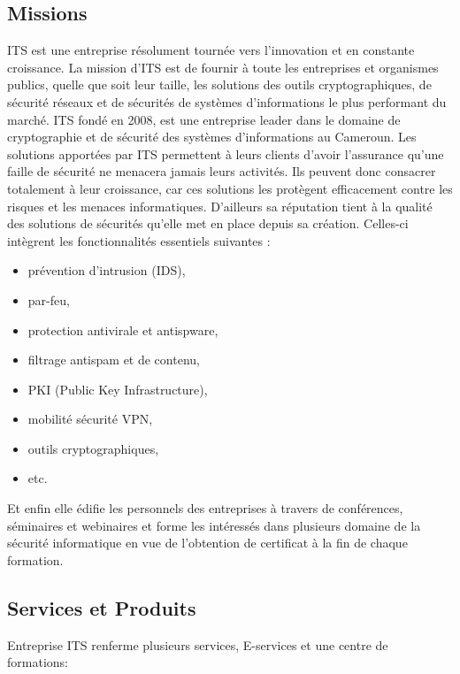 		\subsection{Missions}
			ITS est une entreprise résolument tournée vers l'innovation et en constante croissance. La mission d'ITS est de fournir à toute les entreprises et organismes publics, quelle que soit leur taille, les solutions des outils cryptographiques, de sécurité réseaux et de sécurités de systèmes d'informations le plus performant du marché. ITS fondé en 2008, est une entreprise leader dans le domaine de cryptographie et de sécurité des systèmes d'informations au Cameroun. Les solutions apportées par ITS permettent à leurs clients d'avoir l'assurance qu'une faille de sécurité ne menacera  jamais leurs activités. Ils peuvent donc consacrer totalement à leur croissance, car ces solutions les protègent efficacement contre les risques et les menaces informatiques. 
			D'ailleurs	sa réputation tient à la qualité des solutions de sécurités qu'elle met en place depuis sa création. Celles-ci intègrent les fonctionnalités essentiels suivantes :
			\begin{itemize}
				\item prévention d'intrusion (IDS),
				\item par-feu,
				\item protection antivirale et antispware,
				\item filtrage antispam et de contenu,
				\item PKI (Public Key Infrastructure),
				\item mobilité sécurité VPN,
				\item outils cryptographiques,
				\item etc.
			\end{itemize}
			Et enfin elle édifie les personnels des entreprises à travers de conférences, séminaires et webinaires et forme les intéressés dans plusieurs domaine de la sécurité informatique en vue de l'obtention de certificat à la fin de chaque formation.
		\subsection{Services et Produits}
			Entreprise ITS renferme plusieurs services, E-services et une centre de formations:
